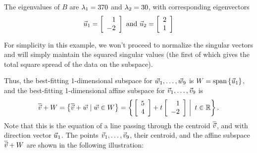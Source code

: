 \documentclass{ximera}
\begin{document}
\begin{solution}
    The eigenvalues of $B$ are $\eigenvar_1 = 370$ and $\eigenvar_2 =
    30$, with corresponding eigenvectors
    \begin{equation*}
      \vect{u}_1 = \startmat{r} 1 \\ -2 \stopmat
      \quad\mbox{and}\quad
      \vect{u}_2 = \startmat{r} 2 \\ 1 \stopmat
    \end{equation*}

    For simplicity in this example, we won't proceed to normalize the singular vectors and will simply maintain the squared singular values (the first of which gives the total square spread of the data on the subspace). 
    
    Thus, the best-fitting 1-dimensional subspace for
    $\vect{w}_1,\ldots,\vect{w}_9$ is $W = \sspan\set{\vect{u}_1}$, and
    the best-fitting 1-dimensional affine subspace for
    $\vect{v}_1,\ldots,\vect{v}_9$ is
    \begin{equation*}
      \centroid{\vect{v}} + W
      = \set{\centroid{\vect{v}} + \vect{w} \mid \vect{w}\in W}
      = \set{\left.\startmat{r} 5 \\ 4 \stopmat +
          t\startmat{r} 1 \\ -2 \stopmat ~\right\vert~ t\in\R}.
    \end{equation*}
    Note that this is the equation of a line passing through the
    centroid $\centroid{\vect{v}}$, and with direction vector
    $\vect{u}_1$. The points $\vect{v}_1,\ldots,\vect{v}_9$, their
    centroid, and the affine subspace $\centroid{\vect{v}} + W$ are
    shown in the following illustration:
    \begin{center}
    \end{center}
    \vspace{-4ex}\par  
  \end{solution}
\end{document}
